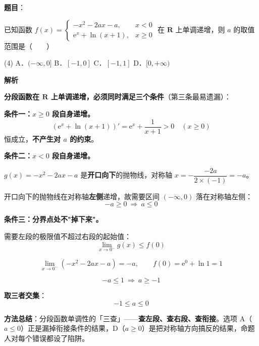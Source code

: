 \begin{answer}

\textbf{题目}：

已知函数 $f(x)=\begin{cases}-x^{2}-2ax-a,&x<0\\ \mathrm{e}^{x}+\ln(x+1),&x\ge0\end{cases}$ 在 $\mathbf R$ 上单调递增，则 $a$ 的取值范围是\mbox{（　　）}

\begin{gkopts}(4)
\task A．$(-\infty,0]$
\task B．$[-1,0]$
\task C．$[-1,1]$
\task D．$[0,+\infty)$
\end{gkopts}

\textbf{解析}

\textbf{分段函数在 $\mathbf R$ 上单调递增，必须同时满足三个条件}（第三条最易遗漏）：

\textbf{条件一：$x\ge0$ 段自身递增。}
\nopagebreak[4]
\[\left(\mathrm e^{x}+\ln(x+1)\right)'=\mathrm e^{x}+\frac1{x+1}>0\quad(x\ge0)\]
恒成立，\textbf{不产生对 $a$ 的约束}。

\textbf{条件二：$x<0$ 段自身递增。}

$g(x)=-x^{2}-2ax-a$ 是\textbf{开口向下}的抛物线，对称轴 $x=-\dfrac{-2a}{2\times(-1)}=-a$。

开口向下的抛物线在对称轴\textbf{左侧}递增，故需要区间 $(-\infty,0)$ 落在对称轴左侧：
\nopagebreak[4]
\[-a\ge0\ \Longrightarrow\ a\le0\]

\textbf{条件三：分界点处不"掉下来"。}

需要左段的极限值不超过右段的起始值：
\nopagebreak[4]
\[\lim_{x\to0^{-}}g(x)\le f(0)\]

\nopagebreak[4]
\[\lim_{x\to0^{-}}\left(-x^{2}-2ax-a\right)=-a,\qquad f(0)=\mathrm e^{0}+\ln1=1\]

\nopagebreak[4]
\[-a\le1\ \Longrightarrow\ a\ge-1\]

\textbf{取三者交集}：
\nopagebreak[4]
\[-1\le a\le0\]

\begin{gktip}
\textbf{方法总结}：分段函数单调性的「三查」——\textbf{查左段、查右段、查衔接}。选项 A（$a\le0$）正是漏掉衔接条件的结果，D（$a\ge0$）是把对称轴方向搞反的结果，命题人对每个错误都设了陷阱。
\end{gktip}


\par\medskip

\end{answer}
